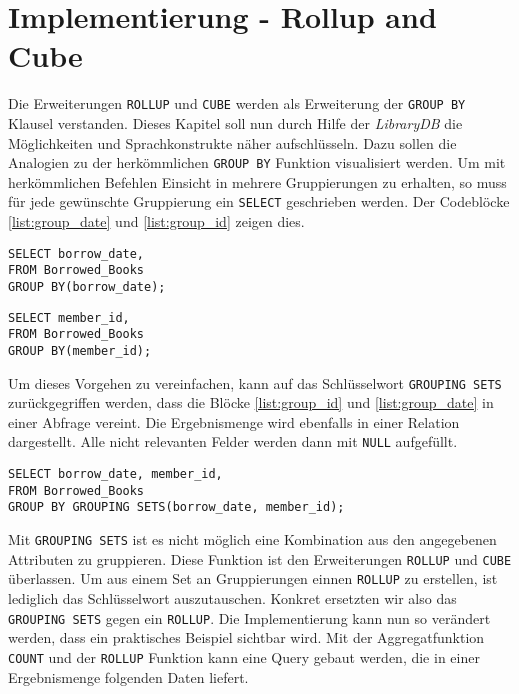 \section{Implementierung - Rollup and Cube}
\label{sec:implementierung_rollup_and_cube} Die Erweiterungen \texttt{ROLLUP}
und \texttt{CUBE} werden als Erweiterung der \texttt{GROUP BY} Klausel
verstanden. Dieses Kapitel soll nun durch Hilfe der \textit{LibraryDB} die
Möglichkeiten und Sprachkonstrukte näher aufschlüsseln. Dazu sollen die Analogien
zu der herkömmlichen \texttt{GROUP BY} Funktion visualisiert werden. Um mit herkömmlichen
Befehlen Einsicht in mehrere Gruppierungen zu erhalten, so muss für jede
gewünschte Gruppierung ein \texttt{SELECT} geschrieben werden. Der Codeblöcke
\ref{list:group_date} und \ref{list:group_id} zeigen dies.

\begin{minipage}{0.45\textwidth}
	 \begin{lstlisting}
SELECT borrow_date,
FROM Borrowed_Books
GROUP BY(borrow_date);
	\end{lstlisting}
\end{minipage}
\hfill
\begin{minipage}{0.45\textwidth}
	 \begin{lstlisting}
SELECT member_id,
FROM Borrowed_Books
GROUP BY(member_id);
	\end{lstlisting}
\end{minipage}

Um dieses Vorgehen zu vereinfachen, kann auf das Schlüsselwort \texttt{GROUPING
SETS} zurückgegriffen werden, dass die Blöcke \ref{list:group_id} und
\ref{list:group_date} in einer Abfrage vereint. Die Ergebnismenge wird ebenfalls
in einer Relation dargestellt. Alle nicht relevanten Felder werden dann mit
\texttt{NULL} aufgefüllt.

\begin{lstlisting}[caption={Beispiel eines Grouping sets}, label={list:grouping_sets}]
SELECT borrow_date, member_id,
FROM Borrowed_Books
GROUP BY GROUPING SETS(borrow_date, member_id);
\end{lstlisting}

Mit \texttt{GROUPING SETS} ist es nicht möglich eine Kombination aus den angegebenen
Attributen zu gruppieren. Diese Funktion ist den Erweiterungen \texttt{ROLLUP} und
\texttt{CUBE} überlassen. Um aus einem Set an Gruppierungen einnen \texttt{ROLLUP}
zu erstellen, ist lediglich das Schlüsselwort auszutauschen. Konkret ersetzten
wir also das \texttt{GROUPING SETS} gegen ein \texttt{ROLLUP}. Die Implementierung
kann nun so verändert werden, dass ein praktisches Beispiel sichtbar wird. Mit der
Aggregatfunktion \texttt{COUNT} und der \texttt{ROLLUP} Funktion kann eine Query
gebaut werden, die in einer Ergebnismenge folgenden Daten liefert.


